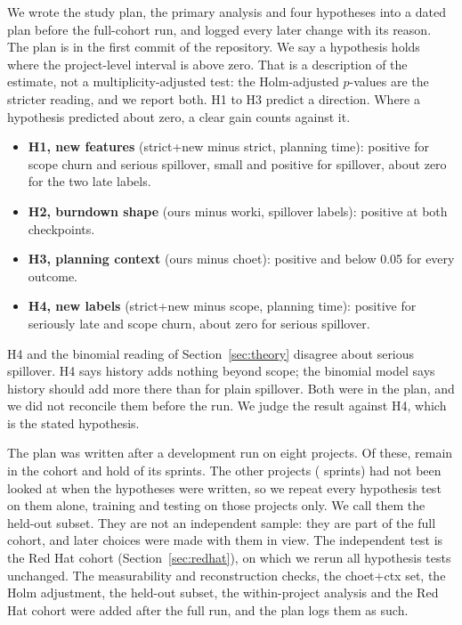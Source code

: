 We wrote the study plan, the primary analysis and four hypotheses into a dated plan before the full-cohort run, and logged every later change with its reason. The plan is in the first commit of the repository. We say a hypothesis holds where the project-level interval is above zero. That is a description of the estimate, not a multiplicity-adjusted test: the Holm-adjusted $p$-values are the stricter reading, and we report both. H1 to H3 predict a direction. Where a hypothesis predicted about zero, a clear gain counts against it.
\begin{itemize}
\item \textbf{H1, new features} (strict+new minus strict, planning time): positive for scope churn and serious spillover, small and positive for spillover, about zero for the two late labels.
\item \textbf{H2, burndown shape} (ours minus worki, spillover labels): positive at both checkpoints.
\item \textbf{H3, planning context} (ours minus choet): positive and below 0.05 for every outcome.
\item \textbf{H4, new labels} (strict+new minus scope, planning time): positive for seriously late and scope churn, about zero for serious spillover.
\end{itemize}
H4 and the binomial reading of Section~\ref{sec:theory} disagree about serious spillover. H4 says history adds nothing beyond scope; the binomial model says history should add more there than for plain spillover. Both were in the plan, and we did not reconcile them before the run. We judge the result against H4, which is the stated hypothesis.

The plan was written after a development run on eight projects. Of these, \DevProj{} remain in the cohort and hold \DevSprints{} of its sprints. The other \ConfProj{} projects (\ConfSprints{} sprints) had not been looked at when the hypotheses were written, so we repeat every hypothesis test on them alone, training and testing on those projects only. We call them the held-out subset. They are not an independent sample: they are part of the full cohort, and later choices were made with them in view. The independent test is the Red Hat cohort (Section~\ref{sec:redhat}), on which we rerun all hypothesis tests unchanged. The measurability and reconstruction checks, the choet+ctx set, the Holm adjustment, the held-out subset, the within-project analysis and the Red Hat cohort were added after the full run, and the plan logs them as such.

